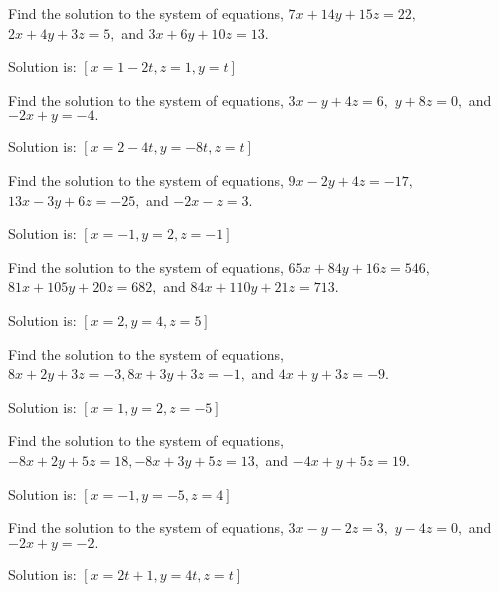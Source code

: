 \begin{enumialphparenastyle}
\begin{ex} Find the solution to the system of equations, $7x+14y+15z=22,
$ $2x+4y+3z=5,$ and $3x+6y+10z=13.$
\begin{sol}
Solution is: $\left[ x=1-2t,z=1,y=t\right] $
\end{sol}
\end{ex}

\begin{ex} Find the solution to the system of equations, $3x-y+4z=6,$ 
$y+8z=0,$ and $-2x+y=-4.$
\begin{sol}
Solution is: $\left[ x=2-4t,y=-8t,z=t\right] $
\end{sol}
\end{ex}

\begin{ex} Find the solution to the system of equations, $9x-2y+4z=-17,
$ $13x-3y+6z=-25,$ and $-2x-z=3.$
\begin{sol}
 Solution is: $\left[x=-1,y=2,z=-1\right] $
\end{sol}
\end{ex}

\begin{ex} Find the solution to the system of equations,
$65x+84y+16z=546,$ $81x+105y+20z=682,$ and $84x+110y+21z=713.$
\begin{sol}
Solution is:
$\left[ x=2,y=4,z=5\right] $
\end{sol}
\end{ex}

\begin{ex} Find the solution to the system of equations, 
$8x+2y+3z=-3,8x+3y+3z=-1,$ and $4x+y+3z=-9.$
\begin{sol}
Solution is: $\left[ x=1,y=2,z=-5\right] $
\end{sol}
\end{ex}

\begin{ex} Find the solution to the system of equations, 
$-8x+2y+5z=18,-8x+3y+5z=13,$ and $-4x+y+5z=19.$
\begin{sol}
 Solution is: $\left[x=-1,y=-5,z=4\right] $
\end{sol}
\end{ex}

\begin{ex} Find the solution to the system of equations, $3x-y-2z=3,$ 
$y-4z=0,$ and $-2x+y=-2.$
\begin{sol}
Solution is: $\left[ x=2t+1,y=4t,z=t\right] $
\end{sol}
\end{ex}


\end{enumialphparenastyle}

